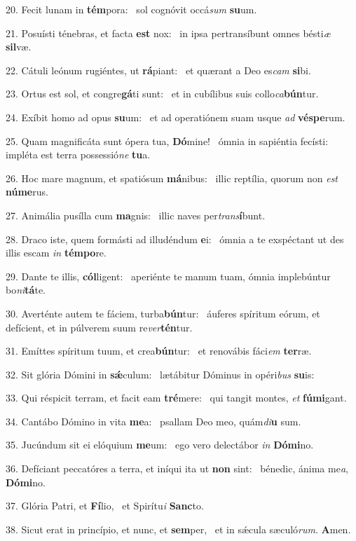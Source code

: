 20. Fecit lunam in \textbf{tém}pora: \ast\  sol cognóvit occá\textit{sum} \textbf{su}um.\

21. Posuísti ténebras, et facta \textbf{est} nox: \ast\  in ipsa pertransíbunt omnes bésti\textit{æ} \textbf{sil}væ.\

22. Cátuli leónum rugiéntes, ut \textbf{rá}piant: \ast\  et quærant a Deo es\textit{cam} \textbf{si}bi.\

23. Ortus est sol, et congre\textbf{gá}ti sunt: \ast\  et in cubílibus suis collo\textit{ca}\textbf{bún}tur.\

24. Exíbit homo ad opus \textbf{su}um: \ast\  et ad operatiónem suam usque \textit{ad} \textbf{vés}\textbf{pe}rum.\

25. Quam magnificáta sunt ópera tua, \textbf{Dó}mine! \ast\  ómnia in sapiéntia fecísti: impléta est terra possessió\textit{ne} \textbf{tu}a.\

26. Hoc mare magnum, et spatiósum \textbf{má}nibus: \ast\  illic reptília, quorum non \textit{est} \textbf{nú}\textbf{me}rus.\

27. Animália pusílla cum \textbf{ma}gnis: \ast\  illic naves per\textit{trans}\textbf{í}bunt.\

28. Draco iste, quem formásti ad illudéndum \textbf{e}i: \ast\  ómnia a te exspéctant ut des illis escam \textit{in} \textbf{tém}\textbf{po}re.\

29. Dante te illis, \textbf{cól}ligent: \ast\  aperiénte te manum tuam, ómnia implebúntur bo\textit{ni}\textbf{tá}te.\

30. Averténte autem te fáciem, turba\textbf{bún}tur: \ast\  áuferes spíritum eórum, et defícient, et in púlverem suum re\textit{ver}\textbf{tén}tur.\

31. Emíttes spíritum tuum, et crea\textbf{bún}tur: \ast\  et renovábis fáci\textit{em} \textbf{ter}ræ.\

32. Sit glória Dómini in \textbf{sǽ}culum: \ast\  lætábitur Dóminus in opéri\textit{bus} \textbf{su}is:\

33. Qui réspicit terram, et facit eam \textbf{tré}mere: \ast\  qui tangit montes, \textit{et} \textbf{fú}\textbf{mi}gant.\

34. Cantábo Dómino in vita \textbf{me}a: \ast\  psallam Deo meo, quám\textit{di}\textbf{u} sum.\

35. Jucúndum sit ei elóquium \textbf{me}um: \ast\  ego vero delectábor \textit{in} \textbf{Dó}\textbf{mi}no.\

36. Defíciant peccatóres a terra, et iníqui ita ut \textbf{non} sint: \ast\  bénedic, ánima me\textit{a}, \textbf{Dó}\textbf{mi}no.\

37. Glória Patri, et \textbf{Fí}lio, \ast\  et Spirítu\textit{i} \textbf{Sanc}to.\

38. Sicut erat in princípio, et nunc, et \textbf{sem}per, \ast\  et in sǽcula sæculó\textit{rum}. \textbf{A}men.\

